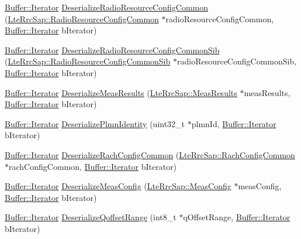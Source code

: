 \begin{DoxyCompactItemize}
\item 
\hyperlink{classns3_1_1Buffer_1_1Iterator}{Buffer\+::\+Iterator} \hyperlink{classns3_1_1RrcAsn1Header_ade211012c3628814ad76c0013d089483}{Deserialize\+Radio\+Resource\+Config\+Common} (\hyperlink{structns3_1_1LteRrcSap_1_1RadioResourceConfigCommon}{Lte\+Rrc\+Sap\+::\+Radio\+Resource\+Config\+Common} $\ast$radio\+Resource\+Config\+Common, \hyperlink{classns3_1_1Buffer_1_1Iterator}{Buffer\+::\+Iterator} b\+Iterator)
\item 
\hyperlink{classns3_1_1Buffer_1_1Iterator}{Buffer\+::\+Iterator} \hyperlink{classns3_1_1RrcAsn1Header_af9c55f79d37667463fe12d6d1304b7e5}{Deserialize\+Radio\+Resource\+Config\+Common\+Sib} (\hyperlink{structns3_1_1LteRrcSap_1_1RadioResourceConfigCommonSib}{Lte\+Rrc\+Sap\+::\+Radio\+Resource\+Config\+Common\+Sib} $\ast$radio\+Resource\+Config\+Common\+Sib, \hyperlink{classns3_1_1Buffer_1_1Iterator}{Buffer\+::\+Iterator} b\+Iterator)
\item 
\hyperlink{classns3_1_1Buffer_1_1Iterator}{Buffer\+::\+Iterator} \hyperlink{classns3_1_1RrcAsn1Header_a656187c4af13c81062863e6920989d06}{Deserialize\+Meas\+Results} (\hyperlink{structns3_1_1LteRrcSap_1_1MeasResults}{Lte\+Rrc\+Sap\+::\+Meas\+Results} $\ast$meas\+Results, \hyperlink{classns3_1_1Buffer_1_1Iterator}{Buffer\+::\+Iterator} b\+Iterator)
\item 
\hyperlink{classns3_1_1Buffer_1_1Iterator}{Buffer\+::\+Iterator} \hyperlink{classns3_1_1RrcAsn1Header_a50855ae1c2fda4b56c194497755971d6}{Deserialize\+Plmn\+Identity} (uint32\+\_\+t $\ast$plmn\+Id, \hyperlink{classns3_1_1Buffer_1_1Iterator}{Buffer\+::\+Iterator} b\+Iterator)
\item 
\hyperlink{classns3_1_1Buffer_1_1Iterator}{Buffer\+::\+Iterator} \hyperlink{classns3_1_1RrcAsn1Header_a4fb01dd5cdf7fce787facd85783c812a}{Deserialize\+Rach\+Config\+Common} (\hyperlink{structns3_1_1LteRrcSap_1_1RachConfigCommon}{Lte\+Rrc\+Sap\+::\+Rach\+Config\+Common} $\ast$rach\+Config\+Common, \hyperlink{classns3_1_1Buffer_1_1Iterator}{Buffer\+::\+Iterator} b\+Iterator)
\item 
\hyperlink{classns3_1_1Buffer_1_1Iterator}{Buffer\+::\+Iterator} \hyperlink{classns3_1_1RrcAsn1Header_a2bad164e0412e09c0f68aeaee202ee35}{Deserialize\+Meas\+Config} (\hyperlink{structns3_1_1LteRrcSap_1_1MeasConfig}{Lte\+Rrc\+Sap\+::\+Meas\+Config} $\ast$meas\+Config, \hyperlink{classns3_1_1Buffer_1_1Iterator}{Buffer\+::\+Iterator} b\+Iterator)
\item 
\hyperlink{classns3_1_1Buffer_1_1Iterator}{Buffer\+::\+Iterator} \hyperlink{classns3_1_1RrcAsn1Header_aca9c8488200eb19c7bc853225777c8df}{Deserialize\+Qoffset\+Range} (int8\+\_\+t $\ast$q\+Offset\+Range, \hyperlink{classns3_1_1Buffer_1_1Iterator}{Buffer\+::\+Iterator} b\+Iterator)

\end{DoxyCompactItemize}
